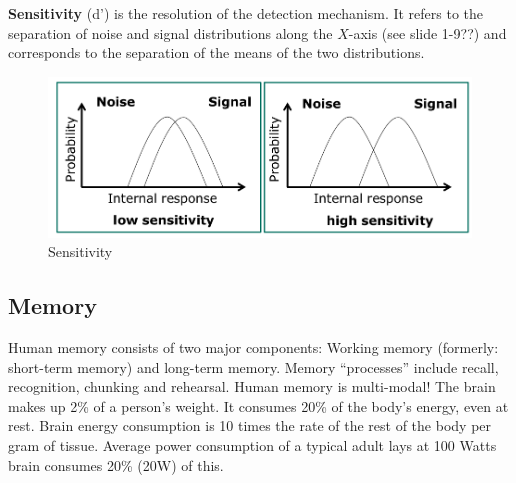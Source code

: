 \textbf{Sensitivity} (d’) is the resolution of the detection mechanism. It refers to the separation of noise and signal distributions along the $X$-axis (see slide 1-9??) and corresponds to the separation of the means of the two distributions.
\begin{figure}[h!]
	\centering
	\includegraphics[width=.5\textwidth]{img/ch03_std3.png}
	\caption{Sensitivity}
	\label{std3}
\end{figure} 

\subsection{Memory}
Human memory consists of two major components: Working memory (formerly: short-term memory) and long-term memory. Memory ``processes'' include recall, recognition, chunking and rehearsal. Human memory is multi-modal! The brain makes up 2\% of a person's weight. It consumes 20\% of the body's energy, even at rest. Brain energy consumption is 10 times the rate of the rest of the body per gram of tissue. Average power consumption of a typical adult lays at 
100 Watts brain consumes 20\% (20W) of this.

